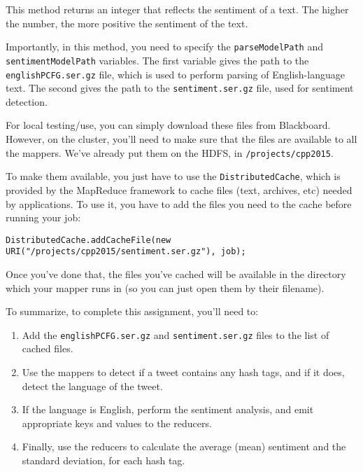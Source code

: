 \documentclass[a4paper,10pt]{article}
\begin{document}
  This method returns an integer that reflects the sentiment of a text. The higher the number, the more positive the sentiment of the text.
  
  Importantly, in this method, you need to specify the \texttt{parseModelPath} and \texttt{sentimentModelPath} variables. The first variable
  gives the path to the \texttt{englishPCFG.ser.gz} file, which is used to perform parsing of English-language text. The second gives the
  path to the \texttt{sentiment.ser.gz} file, used for sentiment detection.

  For local testing/use, you can simply download these files from Blackboard. However, on the cluster, you'll need to make sure that the files
  are available to all the mappers. We've already put them on the HDFS, in \texttt{/projects/cpp2015}.

  To make them available, you just have to use the \texttt{DistributedCache}, which is provided by the MapReduce framework to cache files (text, archives, etc) needed by applications. To use it, you have to add the files you need to the cache before running your job:

\begin{lstlisting}
DistributedCache.addCacheFile(new URI("/projects/cpp2015/sentiment.ser.gz"), job);
\end{lstlisting}

  Once you've done that, the files you've cached will be available in the directory which your mapper runs in (so you can just open them
  by their filename).

  To summarize, to complete this assignment, you'll need to:
  
  \begin{enumerate}
    \item Add the \texttt{englishPCFG.ser.gz} and \texttt{sentiment.ser.gz} files to the list of cached files.
    \item Use the mappers to detect if a tweet contains any hash tags, and if it does, detect the language of the tweet.
    \item If the language is English, perform the sentiment analysis, and emit appropriate keys and values to the reducers.
    \item Finally, use the reducers to calculate the average (mean) sentiment and the standard deviation, for each hash tag.
  \end{enumerate}
  
\end{document}
